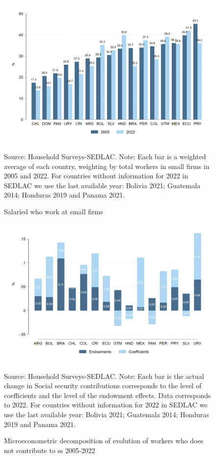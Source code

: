 \documentclass[english]{article}
\begin{document}
\begin{figure}[H]
    \justifying
     \caption{Salaried who work at small firms}     
     \centerline{\includegraphics[scale=.3]{latex/figures/Snapshot/snapshot_dependents_small.png}
    \label{fig:SalariedSmall}}
    \footnotesize{Source: Household Surveys-SEDLAC.}
    \footnotesize{Note: Each bar is a weighted average of each country, weighting by total workers in small firms in 2005 and 2022. For countries without information for 2022 in SEDLAC we use the last available year: Bolivia 2021; Guatemala 2014; Honduras 2019 and Panama 2021.}
\end{figure}


\begin{figure}[H]
        \justifying
        \caption{Microeconometric decomposition of evolution of workers who does not contribute to ss 2005-2022}     
       \centerline{\includegraphics[scale=.3]{latex/figures/Snapshot/Oaxaca decomposition level.png}
        \label{fig:Oaxaca_level}}
        \footnotesize{Source: Household Surveys-SEDLAC.}
        \footnotesize{Note: Each bar is the actual change in Social security contributions corresponds to the level of coefficients and the level of the endowment effects.  Data corresponds to 2022. For countries without information for 2022 in SEDLAC we use the last available year: Bolivia 2021; Guatemala 2014; Honduras 2019 and Panama 2021.}
 \end{figure}
\end{document}
